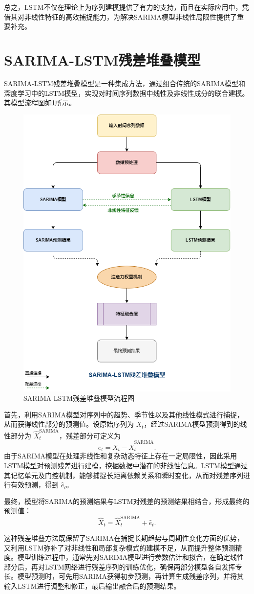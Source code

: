 总之，LSTM不仅在理论上为序列建模提供了有力的支持，而且在实际应用中，凭借其对非线性特征的高效捕捉能力，为解决SARIMA模型非线性局限性提供了重要补充。

\section{SARIMA-LSTM残差堆叠模型}

SARIMA-LSTM残差堆叠模型\cite{dubey2021study}是一种集成方法，通过组合传统的SARIMA模型和深度学习中的LSTM模型，实现对时间序列数据中线性及非线性成分的联合建模。其模型流程图如\ref{fig:SARIMA_LSTM残差堆叠模型流程图}所示。

\begin{figure}[H]
    \centering
    \includegraphics[width=0.6\linewidth]{figure/SARIMA_LSTM.png}
    \caption{SARIMA-LSTM残差堆叠模型流程图}
    \label{fig:SARIMA_LSTM残差堆叠模型流程图}
\end{figure}

首先，利用SARIMA模型对序列中的趋势、季节性以及其他线性模式进行捕捉，从而获得线性部分的预测值。设原始序列为 \(X_t\)，经过SARIMA模型预测得到的线性部分为 \(\hat{X}_t^{\text{SARIMA}}\)，残差部分可定义为
\[
e_t = X_t - \hat{X}_t^{\text{SARIMA}}.
\]
由于SARIMA模型在处理非线性和复杂动态特征上存在一定局限性，因此采用LSTM模型对预测残差进行建模，挖掘数据中潜在的非线性信息。LSTM模型通过其记忆单元及门控机制，能够捕捉长距离依赖关系和瞬时变化，从而对残差序列进行有效预测，得到 \(\hat{e}_t\)。

最终，模型将SARIMA的预测结果与LSTM对残差的预测结果相结合，形成最终的预测值：
\[
\hat{X}_t = \hat{X}_t^{\text{SARIMA}} + \hat{e}_t.
\]


这种残差堆叠方法既保留了SARIMA在捕捉长期趋势与周期性变化方面的优势，又利用LSTM弥补了对非线性和局部复杂模式的建模不足，从而提升整体预测精度。模型训练过程中，通常先对SARIMA模型进行参数估计和拟合，在确定线性部分后，再对LSTM网络进行残差序列的训练优化，确保两部分模型各自发挥专长。模型预测时，可先用SARIMA获得初步预测，再计算生成残差序列，并将其输入LSTM进行调整和修正，最后输出融合后的预测结果。